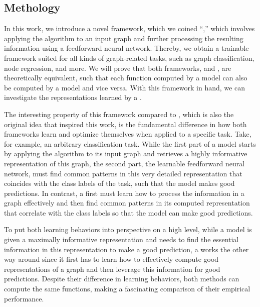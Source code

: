 
\subsection{Methology}
In this work, we introduce a novel framework, which we coined ``\wlnn,'' which involves applying the \wl algorithm to an input graph and further processing the resulting information using a feedforward neural network. Thereby, we obtain a trainable framework suited for all kinds of graph-related tasks, such as graph classification, node regression, and more. We will prove that both frameworks, \wlnn and \gnn, are theoretically equivalent, such that each function computed by a \wlnn model can also be computed by a \gnn model and vice versa. With this framework in hand, we can investigate the representations learned by a \gnn.

The interesting property of this framework compared to \gnns, which is also the original idea that inspired this work, is the fundamental difference in how both frameworks learn and optimize themselves when applied to a specific task. Take, for example, an arbitrary classification task. While the first part of a \wlnn model starts by applying the \wl algorithm to its input graph and retrieves a highly informative representation of this graph, the second part, the learnable feedforward neural network, must find common patterns in this very detailed representation that coincides with the class labels of the task, such that the model makes good predictions. In contrast, a \gnn first must learn how to process the information in a graph effectively and then find common patterns in its computed representation that correlate with the class labels so that the model can make good predictions.

To put both learning behaviors into perspective on a high level, while a \wlnn model is given a maximally informative representation and needs to find the essential information in this representation to make a good prediction, a \gnn works the other way around since it first has to learn how to effectively compute good representations of a graph and then leverage this information for good predictions. Despite their difference in learning behaviors, both methods can compute the same functions, making a fascinating comparison of their empirical performance.

